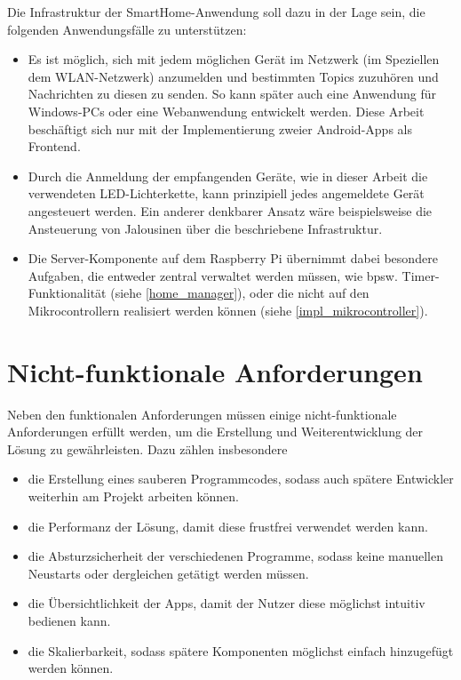 Die Infrastruktur der SmartHome-Anwendung soll dazu in der Lage sein, die folgenden Anwendungsfälle zu unterstützen:
\begin{itemize}
	\item Es ist möglich, sich mit jedem möglichen Gerät im Netzwerk (im Speziellen dem WLAN-Netzwerk) anzumelden und bestimmten Topics zuzuhören und Nachrichten zu diesen zu senden. So kann später auch eine Anwendung für Windows-PCs oder eine Webanwendung entwickelt werden. Diese Arbeit beschäftigt sich nur mit der Implementierung zweier Android-Apps als Frontend.
	\item Durch die Anmeldung der empfangenden Geräte, wie in dieser Arbeit die verwendeten LED-Lichterkette, kann prinzipiell jedes angemeldete Gerät angesteuert werden. Ein anderer denkbarer Ansatz wäre beispielsweise die Ansteuerung von Jalousinen über die beschriebene Infrastruktur.
	\item Die Server-Komponente auf dem Raspberry Pi übernimmt dabei besondere Aufgaben, die entweder zentral verwaltet werden müssen, wie bpsw. Timer-Funktionalität (siehe \ref{home_manager}), oder die nicht auf den Mikrocontrollern realisiert werden können (siehe \ref{impl_mikrocontroller}).
\end{itemize}

\section{Nicht-funktionale Anforderungen}

Neben den funktionalen Anforderungen müssen einige nicht-funktionale Anforderungen erfüllt werden, um die Erstellung und Weiterentwicklung der Lösung zu gewährleisten. Dazu zählen insbesondere
\begin{itemize}
	\item die Erstellung eines sauberen Programmcodes, sodass auch spätere Entwickler weiterhin am Projekt arbeiten können.
	\item die Performanz der Lösung, damit diese frustfrei verwendet werden kann.
	\item die Absturzsicherheit der verschiedenen Programme, sodass keine manuellen Neustarts oder dergleichen getätigt werden müssen. 
	\item die Übersichtlichkeit der Apps, damit der Nutzer diese möglichst intuitiv bedienen kann.
	\item die Skalierbarkeit, sodass spätere Komponenten möglichst einfach hinzugefügt werden können.
\end{itemize}



